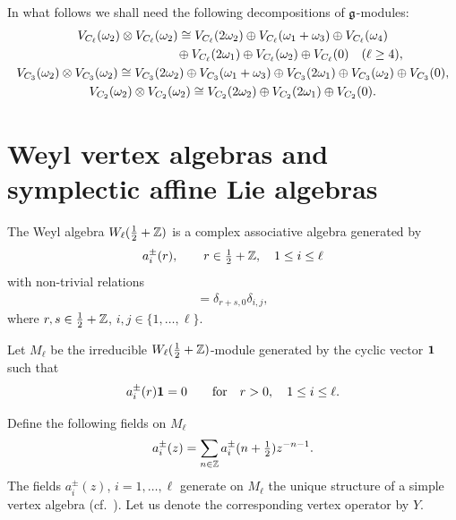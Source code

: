 \documentclass[11pt]{article}
\newcommand{\Z}{\Bbb Z}
\newcommand{\1}{\bf 1}
\begin{document}
In what follows we shall need the following decompositions of $\frak
g$-modules:
%
\begin{gather}
V_{C_{\ell }} (\omega_2) \otimes V_{C_{\ell }} ( \omega_2) \cong
V_{C_{\ell }} (2 \omega_2)\oplus V_{C_{\ell }} ( \omega_1 +
\omega_3) \oplus V_{C_{\ell }} (\omega_4)
\nonumber \\
\hphantom{V_{C_{\ell }} (\omega_2) \otimes V_{C_{\ell }} ( \omega_2) \cong}{}
 \oplus V_{C_{\ell }} (2\omega_1) \oplus
V_{C_{\ell}} ( \omega_2) \oplus V_{C_{\ell }} (0)  \quad ( \ell \ge 4),  \nonumber \\
 V_{C_{3}} (\omega_2) \otimes V_{C_{3}} ( \omega_2) \cong
 V_{C_{3}} (2 \omega_2)\oplus V_{C_{3}} ( \omega_1 +
\omega_3) \oplus V_{C_{3}} (2\omega_1) \oplus
V_{C_{3}} ( \omega_2) \oplus V_{C_{3}} (0), \nonumber \\
 V_{C_{2}}(\omega _2) \otimes V_{C_{2}}(\omega _2) \cong
V_{C_{2}}(2 \omega _2) \oplus V_{C_{2}}(2 \omega _1) \oplus V_{C_{2}}(0). \label{tens-pr-decomp}
 \end{gather}



\section{Weyl vertex algebras and symplectic af\/f\/ine Lie algebras}

The Weyl algebra $W_{\ell}( \tfrac{1}{2} + {\Z})$ is a complex
associative algebra generated by
\[  a ^{\pm} _{i}(r),  \qquad   r  \in \tfrac{1}{2} + {\Z}, \quad 1 \le i
\le \ell
\] with non-trivial relations
\begin{gather*}
 [a_{i} ^{+}(r)  , a_{j} ^{-}(s)  ]  =\delta_{r+s,0} \delta_{i,j},
\end{gather*}
where $r, s \in {\tfrac{1}{2}}+ {\Z}$, $ i, j \in \{1, \dots, \ell
\}$.



 Let $M_{\ell}$ be the irreducible $W_{\ell}( \tfrac{1}{2} + {\Z})$-module generated by
 the
cyclic vector ${\1}$ such that
\[ a^{\pm} _i  (r) {\1}     =  0 \qquad \mbox{for} \quad r > 0 ,  \quad 1
\le i \le \ell.
\]



Def\/ine the following   f\/ields on $M_{\ell}$
%
\[   a_i ^{\pm }(z) = \sum_{ n \in   {\Z}
 } a_i ^{\pm }(n+ \tfrac{1}{2} )  z ^{-n- 1}.
 \]
 The f\/ields $a_{i} ^{\pm }(z)$, $i =1, \dots, \ell$ generate on $M_{\ell}$  the
unique structure of a simple vertex algebra (cf.~\cite{FrB, K}). Let us denote the corresponding vertex operator by $Y$.
\end{document}
